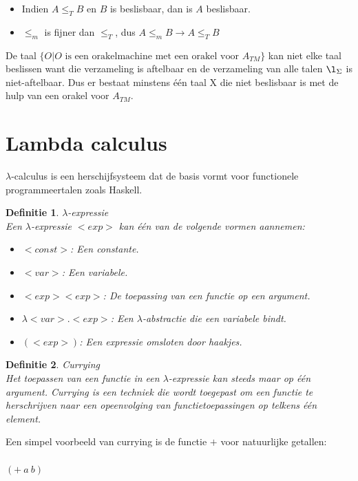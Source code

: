 \documentclass[a4paper]{article}
\newtheorem{tdefinitie}{Definitie}[section]
\newenvironment{definitie}[1]%
  {\begin{mdframed}[backgroundcolor=silver,
    topline=false,
    rightline=false,
    leftline=false,
    bottomline=false]\begin{tdefinitie}#1\\\normalfont}%
  {\end{tdefinitie}\end{mdframed}}
\newcommand{\nat}{\ensuremath{\mathbb{N}}}
\newcommand{\atm}{\ensuremath{{A_{TM}}}}
\begin{document}
\begin{itemize}
\item Indien $A \leq_T B$ en $B$ is beslisbaar, dan is $A$ beslisbaar.
\item $\leq_m$ is fijner dan $\leq_T$, dus $A \leq_m B \rightarrow A \leq_T B$
\end{itemize}

De taal $\{O|O\text{ is een orakelmachine met een orakel voor }\atm\}$ kan niet elke taal beslissen want die verzameling is aftelbaar en de verzameling van alle talen $\l_\Sigma$ is niet-aftelbaar. Dus er bestaat minstens \'e\'en taal X die niet beslisbaar is met de hulp van een orakel voor $\atm$.


\newpage\section{Lambda calculus}

$\lambda$-calculus is een herschijfsysteem dat de basis vormt voor functionele programmeertalen zoals Haskell.

\begin{definitie}{$\lambda$-expressie}
  Een $\lambda$-expressie $<exp>$ kan \'e\'en van de volgende vormen aannemen:
  \begin{itemize}
  \item $<const>$: Een constante.
  \item $<var>$: Een variabele.
  \item $<exp> <exp>$: De toepassing van een functie op een argument.
  \item $\lambda<var>. <exp>$: Een $\lambda$-abstractie die een variabele bindt.
  \item $(<exp>)$: Een expressie omsloten door haakjes.
  \end{itemize}
\end{definitie}

\begin{definitie}{Currying}
  Het toepassen van een functie in een $\lambda$-expressie kan steeds maar op \'e\'en argument. Currying is een techniek die wordt toegepast om een functie te herschrijven naar een opeenvolging van functietoepassingen op telkens \'e\'en element.
\end{definitie}

Een simpel voorbeeld van currying is de functie $+$ voor natuurlijke getallen:\\
\bm{$+: \nat \times \nat \rightarrow \nat$}\\
$(+\ a\ b)$
\end{document}
